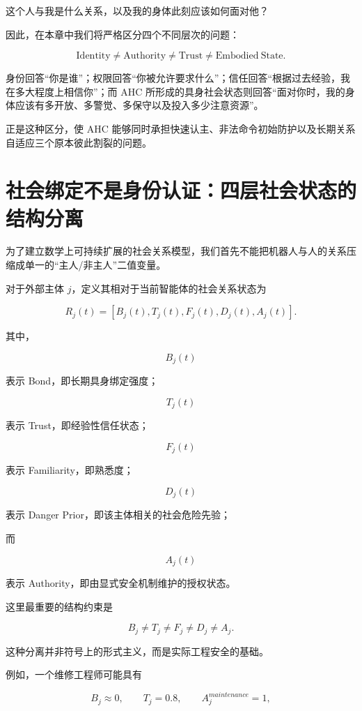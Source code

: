 \begin{statementbox}
这个人与我是什么关系，以及我的身体此刻应该如何面对他？
\end{statementbox}

因此，在本章中我们将严格区分四个不同层次的问题：

\[
\mathrm{Identity}
\neq
\mathrm{Authority}
\neq
\mathrm{Trust}
\neq
\mathrm{Embodied\ State}.
\]

身份回答“你是谁”；权限回答“你被允许要求什么”；信任回答“根据过去经验，我在多大程度上相信你”；而 AHC 所形成的具身社会状态则回答“面对你时，我的身体应该有多开放、多警觉、多保守以及投入多少注意资源”。

正是这种区分，使 AHC 能够同时承担快速认主、非法命令初始防护以及长期关系自适应三个原本彼此割裂的问题。


\section{社会绑定不是身份认证：四层社会状态的结构分离}

为了建立数学上可持续扩展的社会关系模型，我们首先不能把机器人与人的关系压缩成单一的“主人/非主人”二值变量。

对于外部主体 $j$，定义其相对于当前智能体的社会关系状态为

\[
R_j(t)
=
\left[
B_j(t),
T_j(t),
F_j(t),
D_j(t),
A_j(t)
\right].
\]

其中，

\[
B_j(t)
\]

表示 Bond，即长期具身绑定强度；

\[
T_j(t)
\]

表示 Trust，即经验性信任状态；

\[
F_j(t)
\]

表示 Familiarity，即熟悉度；

\[
D_j(t)
\]

表示 Danger Prior，即该主体相关的社会危险先验；

而

\[
A_j(t)
\]

表示 Authority，即由显式安全机制维护的授权状态。

这里最重要的结构约束是

\[
\boxed{
B_j\neq T_j\neq F_j\neq D_j\neq A_j.
}
\]

这种分离并非符号上的形式主义，而是实际工程安全的基础。

例如，一个维修工程师可能具有

\[
B_j\approx 0,
\qquad
T_j=0.8,
\qquad
A_j^{maintenance}=1,
\]

